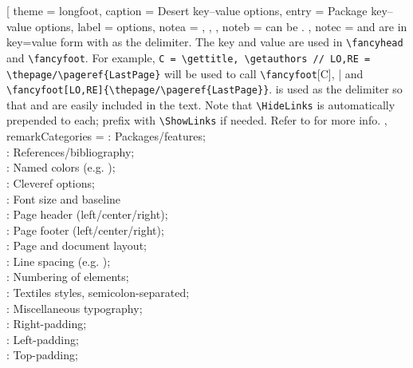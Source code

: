 \begin{BigPages} [hmargin=0.5cm, vmargin=1cm]
\begin{LongTable} [
    theme                  = longfoot,
    caption                = {Desert key--value options},
    entry                  = {Package key--value options},
    label                  = {options},
    note{a}                = {
         \sep
         \sep
    } ,
    note{b}                = {
         can be .
    } ,
    note{c}                = {
         and 
        are in key=value form with \code{//} as the delimiter.
        The key and value are used in \verb|\fancyhead| and \verb|\fancyfoot|.
        For example, \verb|C = \gettitle, \getauthors // LO,RE = \thepage/\pageref{LastPage}| will be used to call
        \verb|\fancyfoot|[C]{\gettitle, \getauthors}| and \verb|\fancyfoot[LO,RE]{\thepage/\pageref{LastPage}}|.
        \code{//} is used as the delimiter so that \code{,} and \code{/} are easily included in the text.
        Note that \verb|\HideLinks| is automatically prepended to each; prefix with \verb|\ShowLinks| if needed.
        Refer to  for more info.
    } ,
    remark{Categories}     = {
        : Packages/features;\\
        : References/bibliography;\\
        : Named colors (e.g. );\\
        : Cleveref options;\\
        : Font size and baseline\\
        : Page header (left/center/right);\\
        : Page footer (left/center/right);\\
        : Page and document layout;\\
        : Line spacing (e.g. );\\
        : Numbering of elements;\\
        : Textiles styles, semicolon-separated;\\
        : Miscellaneous typography;\\
        : Right-padding;\\
        : Left-padding;\\
        : Top-padding;\\
}
\end{LongTable}
\end{BigPages}
